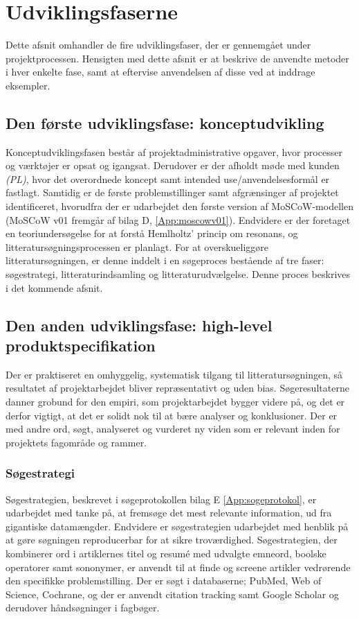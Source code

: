 \vspace{0.5cm}

\section{Udviklingsfaserne}
Dette afsnit omhandler de fire udviklingsfaser, der er gennemgået under projektprocessen. Hensigten med dette afsnit er at beskrive de anvendte metoder i hver enkelte fase, samt at eftervise anvendelsen af disse ved at inddrage eksempler.   
  
\subsection{Den første udviklingsfase: konceptudvikling}

Konceptudviklingsfasen består af projektadministrative opgaver, hvor processer og værktøjer er opsat og igangsat. Derudover er der afholdt møde med kunden \textit{(PL)}, hvor det overordnede koncept samt intended use/anvendelsesformål er fastlagt. Samtidig er de første problemstillinger samt afgrænsinger af projektet identificeret, hvorudfra der er udarbejdet den første version af MoSCoW-modellen (MoSCoW v01 fremgår af bilag D, \ref{App:moscowv01}). Endvidere er der foretaget en teoriundersøgelse for at forstå Hemlholtz' princip om resonans, og litteratursøgningsprocessen er planlagt. For at overskueliggøre litteratursøgningen, er denne inddelt i en søgeproces bestående af tre faser: søgestrategi, litteraturindsamling og litteraturudvælgelse. Denne proces beskrives i det kommende afsnit.  
	
\subsection{Den anden udviklingsfase: high-level produktspecifikation}
Der er praktiseret en omhyggelig, systematisk tilgang til litteratursøgningen, så resultatet af projektarbejdet bliver repræsentativt og uden bias. Søgeresultaterne danner grobund for den empiri, som projektarbejdet bygger videre på, og det er derfor vigtigt, at det er solidt nok til at bære analyser og konklusioner. Der er med andre ord, søgt, analyseret og vurderet ny viden som er relevant inden for projektets fagområde og rammer.  

	\subsubsection{Søgestrategi}
	Søgestrategien, beskrevet i søgeprotokollen bilag E \ref{App:sogeprotokol}, er udarbejdet med tanke på, at fremsøge det mest relevante information, ud fra gigantiske datamængder. Endvidere er søgestrategien udarbejdet med henblik på at gøre søgningen reproducerbar for at sikre troværdighed.  
	Søgestrategien, der kombinerer ord i artiklernes titel og resumé med udvalgte emneord, boolske operatorer samt sononymer, er anvendt til at finde og screene artikler vedrørende den specifikke problemstilling. Der er søgt i databaserne; PubMed, Web of Science, Cochrane, og der er anvendt citation tracking samt Google Scholar og derudover håndsøgninger i fagbøger.  
	
